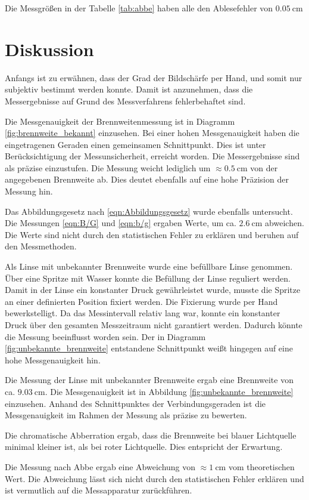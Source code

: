 

Die Messgrößen in der Tabelle \ref{tab:abbe} haben alle den Ablesefehler
von $\SI{0,05}{\centi\meter}$

\section{Diskussion}

Anfangs ist zu erwähnen, dass der Grad der Bildschärfe per Hand, und somit
nur subjektiv bestimmt werden konnte. Damit ist anzunehmen, dass die Messergebnisse
auf Grund des Messverfahrens fehlerbehaftet sind.

Die Messgenauigkeit der Brennweitenmessung ist in Diagramm
\ref{fig:brennweite_bekannt} einzusehen. Bei einer hohen Messgenauigkeit haben
die eingetragenen Geraden einen gemeinsamen Schnittpunkt. Dies ist unter
Berücksichtigung der Messunsicherheit, erreicht worden. Die Messergebnisse
sind als präzise einzustufen. Die Messung weicht lediglich um
$\approx\SI{0,5}{\centi\meter}$ von der angegebenen Brennweite ab. Dies deutet
ebenfalls auf eine hohe Präzision der Messung hin.

Das Abbildungsgesetz nach \eqref{eqn:Abbildungsgesetz} wurde ebenfalls
untersucht. Die Messungen \eqref{eqn:B/G} und \eqref{eqn:b/g} ergaben Werte,
um ca. $\SI{2,6}{\centi\meter}$ abweichen. Die Werte sind nicht durch
den statistischen Fehler zu erklären und beruhen auf den Messmethoden.

Als Linse mit unbekannter Brennweite wurde eine befüllbare Linse genommen. Über eine
Spritze mit Wasser konnte die Befüllung der Linse reguliert werden.
Damit in der Linse ein konstanter Druck gewährleistet wurde, musste die Spritze an
einer definierten Position fixiert werden.
Die Fixierung wurde per Hand bewerkstelligt. Da das Messintervall relativ lang
war, konnte ein konstanter Druck über den gesamten Messzeitraum nicht
garantiert werden. Dadurch könnte
die Messung beeinflusst worden sein. Der in Diagramm
\ref{fig:unbekannte_brennweite} entstandene Schnittpunkt weißt hingegen auf eine
hohe Messgenauigkeit hin.

Die Messung der Linse mit unbekannter Brennweite ergab eine Brennweite von ca. $\SI{9,03}{\centi\meter}$.
Die Messgenauigkeit ist in Abbildung \ref{fig:unbekannte_brennweite} einzusehen.
Anhand des Schnittpunktes der Verbindungsgeraden ist die Messgenauigkeit im Rahmen
der Messung als präzise zu bewerten.

Die chromatische Abberration ergab, dass die Brennweite bei blauer Lichtquelle
minimal kleiner ist, als bei roter Lichtquelle. Dies entspricht der Erwartung.

Die Messung nach Abbe ergab eine Abweichung von
$\approx\SI{1}{\centi\meter}$ vom theoretischen Wert. Die Abweichung lässt
sich nicht durch den statistischen Fehler erklären und ist vermutlich
auf die Messapparatur zurückführen.
